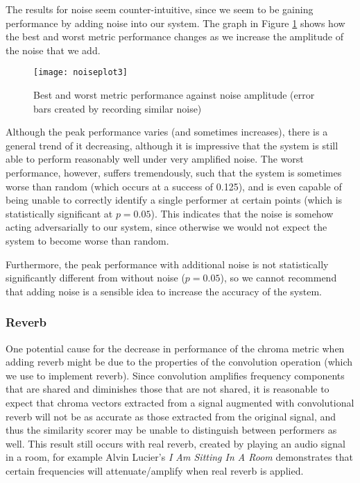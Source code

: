 \documentclass[oneside, class=book, 12pt, crop=false]{standalone}
\begin{document}
The results for noise seem counter-intuitive, since we seem to be gaining performance by adding noise into our system. The graph in Figure \ref{fig:noiseplot} shows how the best and worst metric performance changes as we increase the amplitude of the noise that we add.

\begin{figure}[h]
    \captionsetup{justification=centering}
    \centering
    \texttt{[image: noiseplot3]}
    \caption{Best and worst metric performance against noise amplitude (error bars created by recording similar noise)}
    \label{fig:noiseplot}
\end{figure}

Although the peak performance varies (and sometimes increases), there is a general trend of it decreasing, although it is impressive that the system is still able to perform reasonably well under very amplified noise. The worst performance, however, suffers tremendously, such that the system is sometimes worse than random (which occurs at a success of 0.125), and is even capable of being unable to correctly identify a single performer at certain points (which is statistically significant at $p=0.05$). This indicates that the noise is somehow acting adversarially to our system, since otherwise we would not expect the system to become worse than random.

Furthermore, the peak performance with additional noise is not statistically significantly different from without noise ($p=0.05$), so we cannot recommend that adding noise is a sensible idea to increase the accuracy of the system.

\subsubsection{Reverb}\label{sec:reverb issues}

One potential cause for the decrease in performance of the chroma metric when adding reverb might be due to the properties of the convolution operation (which we use to implement reverb). Since convolution amplifies frequency components that are shared and diminishes those that are not shared, it is reasonable to expect that chroma vectors extracted from a signal augmented with convolutional reverb will not be as accurate as those extracted from the original signal, and thus the similarity scorer may be unable to distinguish between performers as well. This result still occurs with real reverb, created by playing an audio signal in a room, for example Alvin Lucier's \textit{I Am Sitting In A Room}\cite{alvinlucier}  demonstrates that certain frequencies will attenuate/amplify when real reverb is applied.
\end{document}

